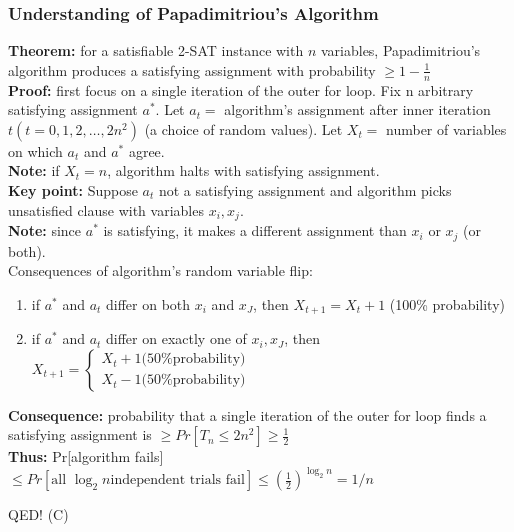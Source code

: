 \documentclass{scrartcl}
\begin{document}
\subsubsection{Understanding of Papadimitriou's Algorithm}
\label{sec:19-7}
{\bf Theorem:} for a satisfiable 2-SAT instance with $n$ variables, Papadimitriou's algorithm produces a satisfying assignment with probability $\geq 1 - \frac1n$\\
{\bf Proof:}  first focus on a single iteration of the outer for loop. 
Fix n arbitrary satisfying assignment $a^*$.
Let $a_t = $ algorithm's assignment after inner iteration $t (t = 0, 1, 2, \dots, 2n^2)$ (a choice of random values).
 Let $X_t = $ number of variables on which $a_t$ and $a^*$ agree.\\
{\bf Note:} if $X_t = n$, algorithm halts with satisfying assignment.\\
{\bf Key point:} Suppose $a_t$ not a satisfying assignment and algorithm picks unsatisfied clause with variables $x_i, x_j$.\\
{\bf Note:} since $a^*$ is satisfying, it makes a different assignment than $x_i$ or $x_j$ (or both).\\
Consequences of algorithm's random variable flip:
\begin{enumerate}
\item if $a^*$ and $a_t$ differ on both $x_i$ and $x_J$, then $X_{t+1} = X_t + 1$ (100\% probability)
\item if $a^*$ and $a_t$ differ on exactly one of $x_i, x_J$, then $X_{t+1} = \left\{\begin{smallmatrix} X_t + 1 \text{(50\% probability)}\\ X_t - 1\text{(50\% probability)} \end{smallmatrix} \right. $ 
\end{enumerate}
{\bf Consequence:} probability that a single iteration of the outer for loop finds a satisfying assignment is $\geq Pr[T_n \leq 2n^2] \geq \frac12$\\
{\bf Thus:} Pr[algorithm fails] $\leq Pr[\text{all } \log_2 n \text{independent trials fail}] \leq (\frac12)^{\log_2 n} = 1/n$
\begin{flushright}  QED! (C)\end{flushright}
\end{document}
